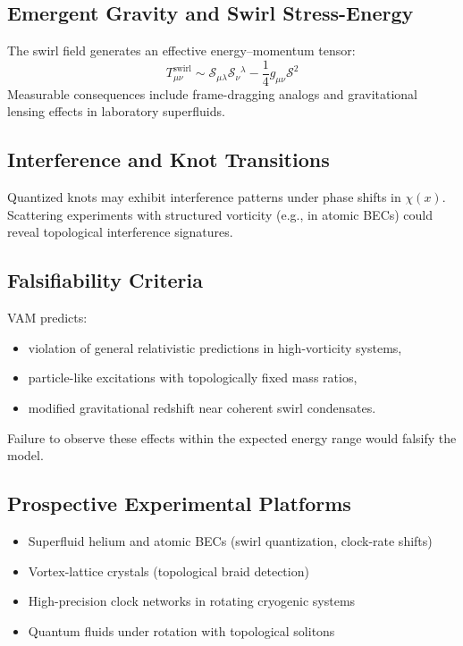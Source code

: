 \subsection{Emergent Gravity and Swirl Stress-Energy}
The swirl field generates an effective energy--momentum tensor:
\begin{equation}
    T_{\mu\nu}^{\text{swirl}} \sim \mathcal{S}_{\mu\lambda} \mathcal{S}_\nu{}^\lambda - \frac{1}{4} g_{\mu\nu} \mathcal{S}^2
\end{equation}
Measurable consequences include frame-dragging analogs and gravitational lensing effects in laboratory superfluids.

\subsection{Interference and Knot Transitions}
Quantized knots may exhibit interference patterns under phase shifts in $\chi(x)$. Scattering experiments with structured vorticity (e.g., in atomic BECs) could reveal topological interference signatures.

\subsection{Falsifiability Criteria}
VAM predicts:
\begin{itemize}
    \item violation of general relativistic predictions in high-vorticity systems,
    \item particle-like excitations with topologically fixed mass ratios,
    \item modified gravitational redshift near coherent swirl condensates.
\end{itemize}
Failure to observe these effects within the expected energy range would falsify the model.

\subsection{Prospective Experimental Platforms}
\begin{itemize}
    \item Superfluid helium and atomic BECs (swirl quantization, clock-rate shifts)
    \item Vortex-lattice crystals (topological braid detection)
    \item High-precision clock networks in rotating cryogenic systems
    \item Quantum fluids under rotation with topological solitons
\end{itemize}

